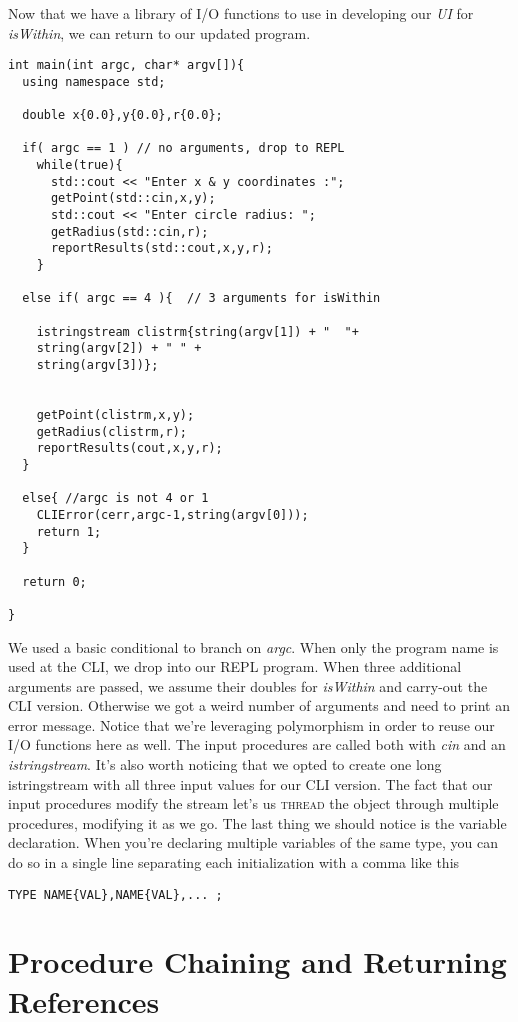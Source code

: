 \documentclass[]{tufte-handout}
\begin{document}
Now that we have a library of I/O functions to use in developing our \textit{UI} for \textit{isWithin}, we can return to our updated program. 
\begin{verbatim}
int main(int argc, char* argv[]){
  using namespace std;

  double x{0.0},y{0.0},r{0.0};

  if( argc == 1 ) // no arguments, drop to REPL
    while(true){
      std::cout << "Enter x & y coordinates :";
      getPoint(std::cin,x,y);
      std::cout << "Enter circle radius: ";
      getRadius(std::cin,r);
      reportResults(std::cout,x,y,r);
    }
    
  else if( argc == 4 ){  // 3 arguments for isWithin

    istringstream clistrm{string(argv[1]) + "  "+
    string(argv[2]) + " " +
    string(argv[3])};


    getPoint(clistrm,x,y);
    getRadius(clistrm,r);
    reportResults(cout,x,y,r);
  }

  else{ //argc is not 4 or 1
    CLIError(cerr,argc-1,string(argv[0]));
    return 1;
  }

  return 0;

}
\end{verbatim}
We used a basic conditional to branch on \textit{argc}. When only the program name is used at the CLI, we drop into our REPL program. When three additional arguments are passed, we assume their doubles for \textit{isWithin} and carry-out the CLI version. Otherwise we got a weird number of arguments and need to print an error message. Notice that we're leveraging polymorphism in order to reuse our I/O functions here as well. The input procedures are called both with \textit{cin} and an \textit{istringstream}.  It's also worth noticing that we opted to create one long istringstream with all three input values for our CLI version. The fact that our input procedures modify the stream let's us \textsc{thread} the object through multiple procedures, modifying it as we go. The last thing we should notice is the variable declaration. When you're declaring multiple variables of the same type, you can do so in a single line separating each initialization with a comma like this
\begin{verbatim}
TYPE NAME{VAL},NAME{VAL},... ;
\end{verbatim}
 

\section{Procedure Chaining and Returning References}
\end{document}
